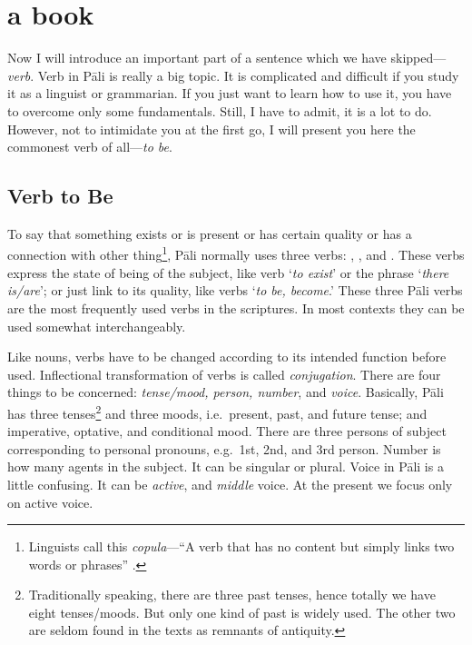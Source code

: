 \chapter{ a book}\label{chap:verb-be}

Now I will introduce an important part of a sentence which we have skipped---\emph{verb}. Verb in P\=ali is really a big topic. It is complicated and difficult if you study it as a linguist or grammarian. If you just want to learn how to use it, you have to overcome only some fundamentals. Still, I have to admit, it is a lot to do. However, not to intimidate you at the first go, I will present you here the commonest verb of all---\emph{to be}.

{}
\section*{Verb to Be}

To say that something exists or is present or has certain quality or has a connection with other thing\footnote{Linguists call this \emph{copula}---``A verb that has no content but simply links two words or phrases'' \citep[p.~112]{brownmiller:dict}.}, P\=ali normally uses three verbs: , , and . These verbs express the state of being of the subject, like verb `\emph{to exist}' or the phrase `\emph{there is/are}'; or just link to its quality, like verbs `\emph{to be, become}.' These three P\=ali verbs are the most frequently used verbs in the scriptures. In most contexts they can be used somewhat interchangeably.

Like nouns, verbs have to be changed according to its intended function before used. Inflectional transformation of verbs is called \emph{conjugation}. There are four things to be concerned: \emph{tense/mood, person, number}, and \emph{voice}. Basically, P\=ali has three tenses\footnote{Traditionally speaking, there are three past tenses, hence totally we have eight tenses/moods. But only one kind of past is widely used. The other two are seldom found in the texts as remnants of antiquity.} and three moods, i.e.\ present, past, and future tense; and imperative, optative, and conditional mood. There are three persons of subject corresponding to personal pronouns, e.g.\ 1st, 2nd, and 3rd person. Number is how many agents in the subject. It can be singular or plural. Voice in P\=ali is a little confusing. It can be \emph{active}, and \emph{middle} voice. At the present we focus only on active voice.


